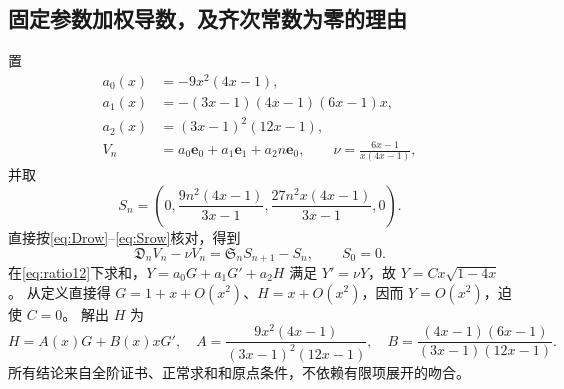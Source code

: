 \documentclass[11pt,a4paper]{article}
\numberwithin{equation}{section}
\theoremstyle{remark}\newtheorem{remark}[theorem]{说明}
\newcommand{\ee}{\boldsymbol e}
\newcommand{\Dop}{\mathfrak D}
\newcommand{\Sop}{\mathfrak S}
\begin{document}
\subsection{固定参数加权导数，及齐次常数为零的理由}
置
\begin{align*}
 a_0(x)&=-9x^2(4x-1),\\
 a_1(x)&=-(3x-1)(4x-1)(6x-1)x,\\
 a_2(x)&=(3x-1)^2(12x-1),\\
 V_n&=a_0\ee_0+a_1\ee_1+a_2n\ee_0,\qquad
 \nu=\frac{6x-1}{x(4x-1)},
\end{align*}
并取
\begin{equation}\label{eq:S12}
 S_n=\left(0,\frac{9n^2(4x-1)}{3x-1},\frac{27n^2x(4x-1)}{3x-1},0\right).
\end{equation}
直接按\eqref{eq:Drow}--\eqref{eq:Srow}核对，得到
\begin{equation}\label{eq:normal12cert}
 \Dop_nV_n-\nu V_n=\Sop_nS_{n+1}-S_n,\qquad S_0=0.
\end{equation}
在\eqref{eq:ratio12}下求和，$Y=a_0G+a_1G'+a_2H$ 满足 $Y'=\nu Y$，故
$Y=Cx\sqrt{1-4x}$。
从定义直接得 $G=1+x+O(x^2)$、$H=x+O(x^2)$，因而 $Y=O(x^2)$，迫使 $C=0$。
解出 $H$ 为
\begin{equation}\label{eq:H12}
 H=A(x)G+B(x)xG',\quad
 A=\frac{9x^2(4x-1)}{(3x-1)^2(12x-1)},\quad
 B=\frac{(4x-1)(6x-1)}{(3x-1)(12x-1)}.
\end{equation}
所有结论来自全阶证书、正常求和和原点条件，不依赖有限项展开的吻合。
\end{document}
